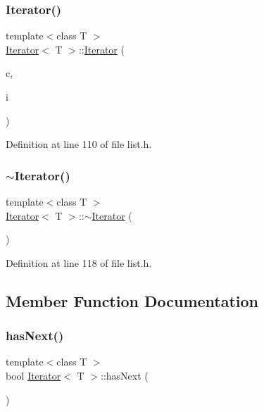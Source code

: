\subsubsection{\texorpdfstring{Iterator()}{Iterator()}}
{\footnotesize\ttfamily template$<$class T $>$ \\
\hyperlink{classIterator}{Iterator}$<$ T $>$\+::\hyperlink{classIterator}{Iterator} (\begin{DoxyParamCaption}\item[{int}]{c,  }\item[{\hyperlink{classListNode}{List\+Node}$<$ T $>$ $\ast$$\ast$}]{i }\end{DoxyParamCaption})}



Definition at line 110 of file list.\+h.

\mbox{\label{classIterator_ae3ca5d592c9550743e6bfe07e5881c13}} 
\subsubsection{\texorpdfstring{$\sim$\+Iterator()}{~Iterator()}}
{\footnotesize\ttfamily template$<$class T $>$ \\
\hyperlink{classIterator}{Iterator}$<$ T $>$\+::$\sim$\hyperlink{classIterator}{Iterator} (\begin{DoxyParamCaption}{ }\end{DoxyParamCaption})}



Definition at line 118 of file list.\+h.



\subsection{Member Function Documentation}
\mbox{\label{classIterator_a69b4bebf4a915a4ee591e6c8bd9b9b9a}} 
\subsubsection{\texorpdfstring{has\+Next()}{hasNext()}}
{\footnotesize\ttfamily template$<$class T $>$ \\
bool \hyperlink{classIterator}{Iterator}$<$ T $>$\+::has\+Next (\begin{DoxyParamCaption}{ }\end{DoxyParamCaption})}



